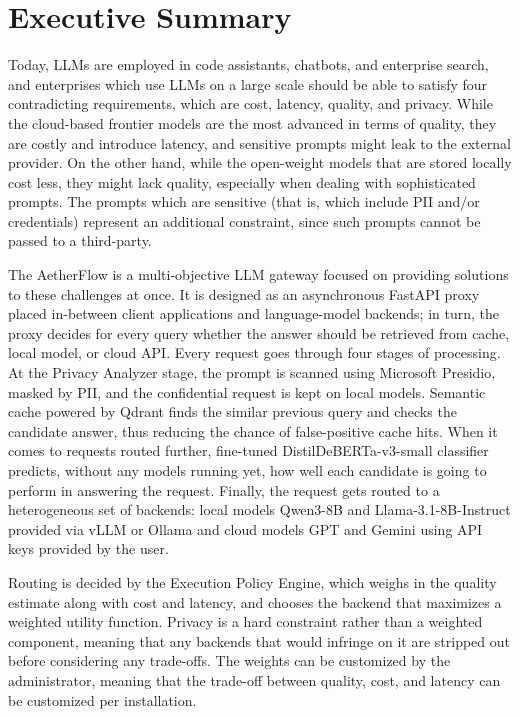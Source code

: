 \documentclass{FastFyp}
\begin{document}
\section*{Executive Summary}

Today, LLMs are employed in code assistants, chatbots, and enterprise search, and enterprises which use LLMs on a large scale should be able to satisfy four contradicting requirements, which are cost, latency, quality, and privacy. While the cloud-based frontier models are the most advanced in terms of quality, they are costly and introduce latency, and sensitive prompts might leak to the external provider. On the other hand, while the open-weight models that are stored locally cost less, they might lack quality, especially when dealing with sophisticated prompts. The prompts which are sensitive (that is, which include PII and/or credentials) represent an additional constraint, since such prompts cannot be passed to a third-party.

The AetherFlow is a multi-objective LLM gateway focused on providing solutions to these challenges at once. It is designed as an asynchronous FastAPI proxy placed in-between client applications and language-model backends; in turn, the proxy decides for every query whether the answer should be retrieved from cache, local model, or cloud API. Every request goes through four stages of processing. At the Privacy Analyzer stage, the prompt is scanned using Microsoft Presidio, masked by PII, and the confidential request is kept on local models. Semantic cache powered by Qdrant finds the similar previous query and checks the candidate answer, thus reducing the chance of false-positive cache hits. When it comes to requests routed further, fine-tuned DistilDeBERTa-v3-small classifier predicts, without any models running yet, how well each candidate is going to perform in answering the request. Finally, the request gets routed to a heterogeneous set of backends: local models Qwen3-8B and Llama-3.1-8B-Instruct provided via vLLM or Ollama and cloud models GPT and Gemini using API keys provided by the user.

Routing is decided by the Execution Policy Engine, which weighs in the quality estimate along with cost and latency, and chooses the backend that maximizes a weighted utility function. Privacy is a hard constraint rather than a weighted component, meaning that any backends that would infringe on it are stripped out before considering any trade-offs. The weights can be customized by the administrator, meaning that the trade-off between quality, cost, and latency can be customized per installation.
\end{document}
